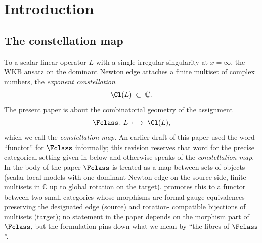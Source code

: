 
\section{Introduction}\label{sec:intro}

\subsection{The constellation map}\label{ssec:intro-functor}

To a scalar linear operator $L$ with a single irregular singularity at
$x = \infty$, the WKB ansatz on the dominant Newton edge attaches a
finite multiset of complex numbers, the \emph{exponent constellation}
\[
   \Cl(L) \;\subset\; \mathbb{C}.
\]
The present paper is about the combinatorial geometry of the
assignment
\[
   \Fclass \colon L \;\longmapsto\; \Cl(L),
\]
which we call the \emph{constellation map}. An earlier draft of this
paper used the word ``functor'' for $\Fclass$ informally; this revision
reserves that word for the precise categorical setting given in
 below and otherwise speaks of the
\emph{constellation map}. In the body of the paper $\Fclass$ is treated
as a map between sets of objects (scalar local models with one dominant
Newton edge on the source side, finite multisets in $\mathbb{C}$ up to
global rotation on the target).  promotes this to
a functor between two small categories whose morphisms are formal gauge
equivalences preserving the designated edge (source) and rotation-
compatible bijections of multisets (target); no statement in the paper
depends on the morphism part of $\Fclass$, but the formulation pins
down what we mean by ``the fibres of $\Fclass$''.

